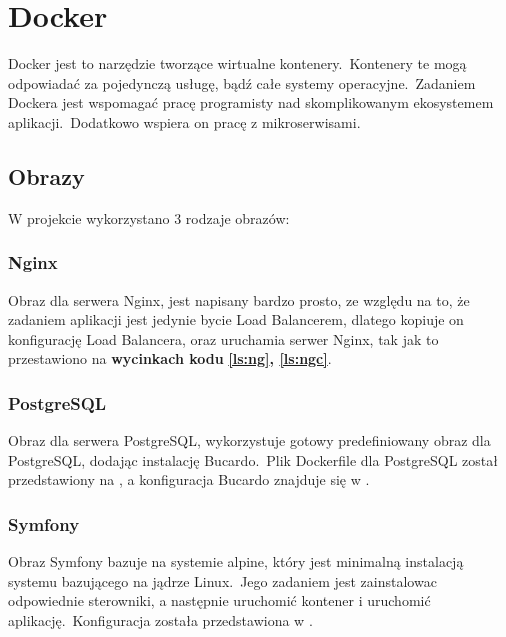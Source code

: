 \chapter{Docker}
Docker jest to narzędzie tworzące wirtualne kontenery.\ Kontenery te mogą odpowiadać za pojedynczą usługę, bądź całe systemy operacyjne.\ Zadaniem Dockera jest wspomagać pracę programisty nad skomplikowanym ekosystemem aplikacji.\ Dodatkowo wspiera on pracę z mikroserwisami.
\section{Obrazy}
W projekcie wykorzystano 3 rodzaje obrazów:

\subsection{Nginx}
Obraz dla serwera Nginx, jest napisany bardzo prosto, ze względu na to, że zadaniem aplikacji jest jedynie bycie Load Balancerem, dlatego kopiuje on konfigurację Load Balancera, oraz uruchamia serwer Nginx, tak jak to przestawiono na \textbf{wycinkach kodu} \textbf{\ref{ls:ng}, \ref{ls:ngc}}.




\subsection{PostgreSQL}
Obraz dla serwera PostgreSQL, wykorzystuje gotowy predefiniowany obraz dla PostgreSQL, dodając instalację Bucardo.\ Plik Dockerfile dla PostgreSQL został przedstawiony na , a konfiguracja Bucardo znajduje się w .




\clearpage
\subsection{Symfony}
Obraz Symfony bazuje na systemie alpine, który jest minimalną instalacją systemu bazującego na jądrze Linux.\ Jego zadaniem jest zainstalowac odpowiednie sterowniki, a następnie uruchomić kontener i uruchomić aplikację.\ Konfiguracja została przedstawiona w .

